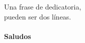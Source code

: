 \documentclass[
	spanish, %
	letterpaper, oneside
]{book}
\begin{document}
\templatePortrait

\templatePagecfg

\begin{abstractd}
	\lipsum[1]
\end{abstractd}

\begin{dedicatory}
	Una frase de dedicatoria, \\
	pueden ser dos líneas. \\
	~ \\
	\textbf{Saludos}
\end{dedicatory}

\begin{acknowledgments}
	\lipsum[1]
\end{acknowledgments}

\templateIndex

\templateFinalcfg



\end{document}
